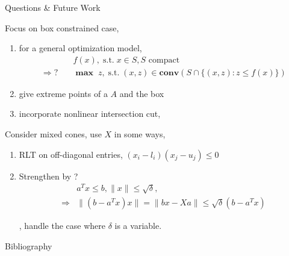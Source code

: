 \documentclass[aspectratio=1610, 10pt]{beamer}
\newcommand{\mx}{\mathbf{\max}\;}
\newcommand{\st}{\mathrm{s.t.\;}}
\newcommand{\conv}{\mathbf{conv}}
\begin{document}
\begin{frame}[allowframebreaks]{Questions \& Future Work}

  Focus on box constrained case,
  \begin{enumerate}
    \item for a general optimization model,
          \begin{align*}
                                & f(x), \;  \st  x \in S, S \text{ compact}                      \\
            \Rightarrow ? \quad & \mx z, \; \st (x, z) \in \conv (S \cap \{(x, z): z \le f(x)\})
          \end{align*}
    \item give extreme points of a \(A\) and the box
    \item incorporate nonlinear intersection cut, \cite{modaresi_convex_2017}
  \end{enumerate}

  Consider mixed cones, use \(X\) in some ways,
  \begin{enumerate}

    \item RLT on off-diagonal entries, \((x_i - l_i)(x_j - u_j) \le 0\)

    \item Strengthen by \cite{ye_new_2003} ?
          \begin{align*}
                        & a^Tx \le b, \|x\| \le \sqrt\delta,                     \\
            \Rightarrow & \|(b - a^Tx)x\| = \|bx - Xa\| \le \sqrt\delta (b-a^Tx)
          \end{align*}

          \cite{guo_quadratic_2014}, handle the case where \(\delta\) is a variable.

  \end{enumerate}

\end{frame}
\begin{frame}[allowframebreaks]{Bibliography}
  
  
\end{frame}
\end{document}
